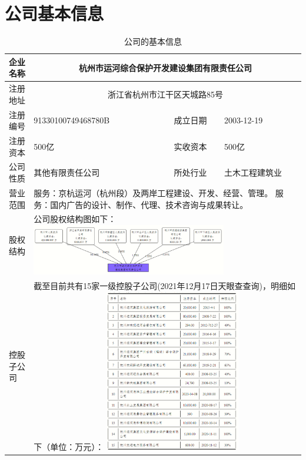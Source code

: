 \documentclass[H:\workspace\担保人财务信息2\杭州大运河\HangZhouText.tex]{subfiles}
\begin{document}
\section{公司基本信息} 
\setlength{\tabcolsep}{0.35em} %
{\renewcommand{\arraystretch}{0.5} %
    \begin{longtable}{
        | p{2.2cm}
        | p{4.4cm}
        | p{2.2cm}
        | p{4.4cm}
        |}
        \caption{公司的基本信息}\\

        \toprule
        \endfirsthead

        \midrule
        \endhead 

        \bottomrule 
        \endlastfoot

        企业名称 & \multicolumn{3}{c|}{杭州市运河综合保护开发建设集团有限责任公司} \\
        \midrule
        注册地址 & \multicolumn{3}{c|}{浙江省杭州市江干区天城路85号} \\
        \midrule 
        注册编号 & 91330100749468780B & 成立日期 & 2003-12-19 \\
        \midrule 
        注册资本 & 500亿 & 实收资本 & 500亿 \\
        \midrule 
        公司性质 & 其他有限责任公司 & 所处行业 & 土木工程建筑业\\
        \midrule 
        营业范围 & \multicolumn{3}{p{11cm}|}{服务：京杭运河（杭州段）及两岸工程建设、开发、经营、管理。 
        服务：国内广告的设计、制作、代理、技术咨询与成果转让。} \\
        \midrule 
        股权结构 & \multicolumn{3}{p{11cm}|}{公司股权结构图如下： 
        \centering
        \includegraphics[width=0.72\textwidth]{img7.png}} \\
        \midrule 
        控股子公司 & \multicolumn{3}{p{11cm}|}{
        截至目前共有15家一级控股子公司(2021年12月17日天眼查查询)，明细如下（单位：万元）：
        \centering 
        \includegraphics[width=0.5\textwidth]{img6.png}} \\
    \end{longtable}
}
\end{document}
